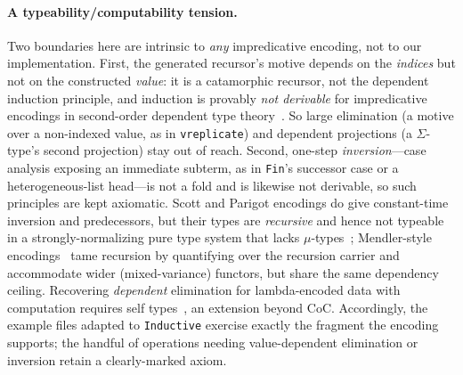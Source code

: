\documentclass[acmsmall,anonymous=false,nonacm]{acmart}
\begin{document}
\paragraph{A typeability/computability tension.}
Two boundaries here are intrinsic to \emph{any} impredicative encoding, not to
our implementation. First, the generated recursor's motive depends on the
\emph{indices} but not on the constructed \emph{value}: it is a catamorphic
recursor, not the dependent induction principle, and induction is provably
\emph{not derivable} for impredicative encodings in second-order dependent type
theory~\cite{geuvers2001induction}. So large elimination (a motive over a
non-indexed value, as in \texttt{vreplicate}) and dependent projections (a
$\Sigma$-type's second projection) stay out of reach. Second, one-step
\emph{inversion}---case analysis exposing an immediate subterm, as in
\texttt{Fin}'s successor case or a heterogeneous-list head---is not a fold and is
likewise not derivable, so such principles are kept axiomatic. Scott and
Parigot encodings do give constant-time inversion and predecessors, but their
types are \emph{recursive} and hence not typeable in a strongly-normalizing pure
type system that lacks $\mu$-types~\cite{parigot1992recursive}; Mendler-style
encodings~\cite{mendler1991inductive} tame recursion by quantifying over the
recursion carrier and accommodate wider (mixed-variance) functors, but share the
same dependency ceiling. Recovering \emph{dependent} elimination for
lambda-encoded data with computation requires self
types~\cite{fu2014self}, an extension beyond CoC. Accordingly, the example files
adapted to \texttt{Inductive} exercise exactly the fragment the encoding
supports; the handful of operations needing value-dependent elimination or
inversion retain a clearly-marked axiom.
\end{document}
